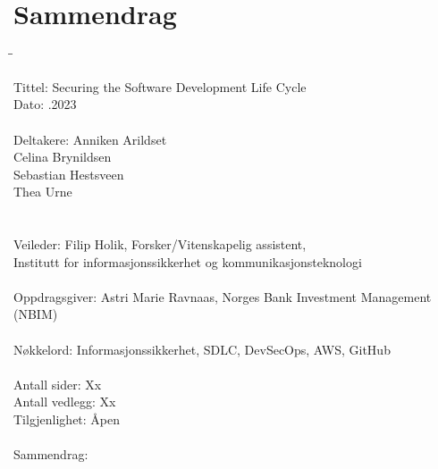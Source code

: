 \newpage
\chapter*{Sammendrag}

\begin{tabbing}
\hspace{2cm}\=\hspace{3cm}\=\kill %

Tittel: \> \> Securing the Software Development Life Cycle \\
Dato: \> .2023 \\ 
\\
Deltakere: \> \> Anniken Arildset \\ \> \> Celina Brynildsen \\ \> \> Sebastian Hestsveen \\ \> \> Thea Urne \\
\\
\\
Veileder: \> \> Filip Holik, Forsker/Vitenskapelig assistent, \\\> \> Institutt for informasjonssikkerhet og kommunikasjonsteknologi \\
\\
Oppdragsgiver: \> \>  Astri Marie Ravnaas, Norges Bank Investment Management (NBIM) \\
\\
Nøkkelord: \> \> Informasjonssikkerhet, SDLC, DevSecOps, AWS, GitHub \\
\\
Antall sider: \> \> Xx \\
Antall vedlegg: \> \> Xx \\
Tilgjenlighet: \> \> Åpen \\
\\
Sammendrag: 

\end{tabbing}


